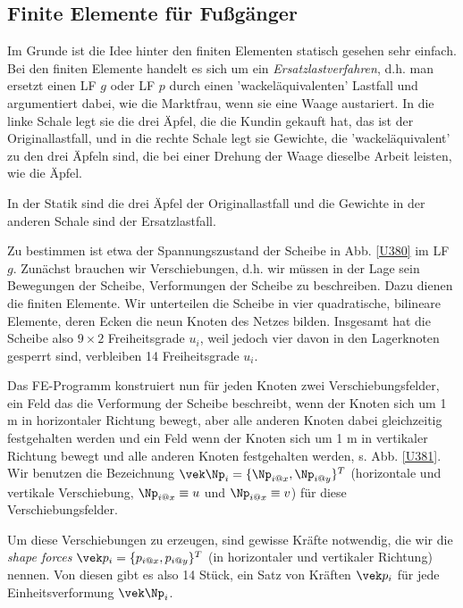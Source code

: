 \textcolor{blau2}{\subsection{Finite Elemente f\"{u}r Fu{\ss}g\"{a}nger}}
Im Grunde ist die Idee hinter den finiten Elementen statisch gesehen sehr einfach. Bei den finiten Elemente handelt es sich um ein {\em Ersatzlastverfahren\/}, d.h. man ersetzt einen LF $g$ oder LF $p$ durch einen 'wackel\"{a}quivalenten' Lastfall und argumentiert dabei, wie die Marktfrau, wenn sie eine Waage austariert. In die linke Schale legt sie die drei \"{A}pfel, die die Kundin gekauft hat, das ist der Originallastfall, und in die rechte Schale legt sie Gewichte, die 'wackel\"{a}quivalent' zu den drei \"{A}pfeln sind, die bei einer Drehung der Waage dieselbe Arbeit leisten, wie die \"{A}pfel.

In der Statik sind die drei \"{A}pfel der Originallastfall und die Gewichte in der anderen Schale sind der Ersatzlastfall.

Zu bestimmen ist etwa der Spannungszustand der Scheibe in Abb. \ref{U380} im LF $g$. Zun\"{a}chst brauchen wir Verschiebungen, d.h. wir m\"{u}ssen in der Lage sein Bewegungen der Scheibe, Verformungen der Scheibe zu beschreiben. Dazu dienen die finiten Elemente. Wir unterteilen die Scheibe in vier quadratische, bilineare Elemente, deren Ecken die neun Knoten des Netzes bilden. Insgesamt hat die Scheibe also $9 \times 2$ Freiheitsgrade $u_i$, weil jedoch vier davon in den Lagerknoten gesperrt sind, verbleiben 14 Freiheitsgrade $u_i$.

Das FE-Programm konstruiert nun f\"{u}r jeden Knoten zwei Verschiebungsfelder, ein Feld das die Verformung der Scheibe beschreibt, wenn der Knoten sich um 1 m in horizontaler Richtung bewegt, aber alle anderen Knoten dabei gleichzeitig festgehalten werden und ein Feld wenn der Knoten sich um 1 m in vertikaler Richtung bewegt und alle anderen Knoten festgehalten werden, s. Abb. \ref{U381}. Wir benutzen die Bezeichnung $\vek \Np_i = \{\Np_{i @x}, \Np_{i @y}\}^T$ (horizontale und vertikale Verschiebung, $\Np_{i @x} \equiv u$ und $\Np_{i @x} \equiv v$) f\"{u}r diese Verschiebungsfelder.

Um diese Verschiebungen zu erzeugen, sind gewisse Kr\"{a}fte notwendig, die wir die {\em shape forces\/} $\vek p_i = \{p_{i @x}, p_{i @y}\}^T$ (in horizontaler und vertikaler Richtung) nennen. Von diesen gibt es also 14 St\"{u}ck, ein Satz von Kr\"{a}ften $\vek p_i$ f\"{u}r jede Einheitsverformung $\vek \Np_i$.

